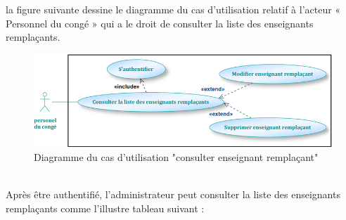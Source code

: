 \documentclass[12 pt ]{report}
\begin{document}
la figure suivante dessine le diagramme du cas d’utilisation  relatif à l’acteur « Personnel du congé » qui a le droit de consulter la liste des enseignants remplaçants.
\begin{figure}[h]
 \begin{center}
\includegraphics[width=13 cm ,height=5 cm]{con_ens_remp.PNG}
\caption{Diagramme du cas d’utilisation "consulter enseignant remplaçant"}
\end{center}
\end{figure}\\
Après être authentifié, l'administrateur peut consulter la  liste des enseignants remplaçants comme l'illustre  tableau suivant : 
\end{document}
